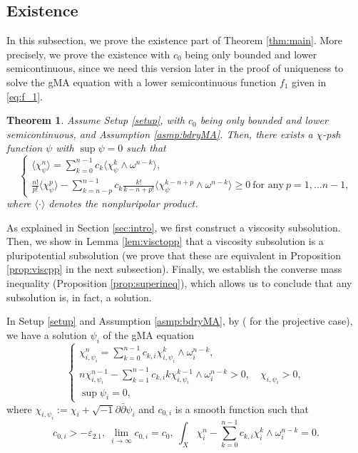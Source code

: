 \documentclass{amsart}
\numberwithin{equation}{section}
\theoremstyle{plain}
\newtheorem{thm}[equation]{Theorem}
\theoremstyle{definition}
\theoremstyle{remark}
\newcommand{\delb}{\sqrt{-1}\partial\bar{\partial}}
\begin{document}
\subsection{Existence}\label{sec:existence}
In this subsection, we prove the existence part of Theorem \ref{thm:main}. More precisely, we prove the existence with $c_0$ being only bounded and lower semicontinuous, since we need this version later in the proof of uniqueness to solve the gMA equation with a lower semicontinuous function $f_1$ given in \eqref{eq:f_1}.

\begin{thm}\label{thm:existence}
    Assume Setup \ref{setup}, with $c_0$ being only bounded and lower semicontinuous, and Assumption \ref{asmp:bdryMA}.
    Then, there exists a $\chi$-psh function $\psi$ with $\sup \psi=0$ such that
    \begin{equation}\label{eq:lscgMA}
    \begin{cases}
        \langle\chi_\psi^n\rangle=\sum_{k=0}^{n-1}c_k\langle\chi_\psi^k\wedge\omega^{n-k}\rangle,
        \\
        \frac{n!}{p!}\langle\chi_\psi^p\rangle-\sum_{k=n-p}^{n-1}c_k\frac{k!}{k-n+p!}\langle\chi_\psi^{k-n+p}\wedge\omega^{n-k}\rangle\ge0 \ \text{for any} \ p=1,\dots n-1, 
    \end{cases}
    \end{equation}
    where $\langle\cdot\rangle$ denotes the nonpluripolar product.
\end{thm}

As explained in Section \ref{sec:intro}, we first construct a viscosity subsolution. 
Then, we show in Lemma \ref{lem:visctopp} that a viscosity subsolution is a pluripotential subsolution (we prove that these are equivalent in Proposition \ref{prop:viscpp} in the next subsection). Finally, we establish the converse mass inequality (Proposition \ref{prop:superineq}), which allows us to conclude that any subsolution is, in fact, a solution.

In Setup \ref{setup} and Assumption \ref{asmp:bdryMA}, by \cite{FM} (\cite{Datar-Pingali} for the projective case), 
we have a solution $\psi_i$ of the gMA equation
\begin{equation}\label{eq:appgMA}
    \begin{cases}
        \chi^n_{i,\psi_i}=\sum_{k=0}^{n-1}c_{k,i}\chi_{i,\psi_i}^k \wedge\omega_i^{n-k},\\
        n\chi_{i,\psi_i}^{n-1}-\sum_{k=1}^{n-1}c_{k,i} k\chi^{k-1}_{i,\psi_i}\wedge\omega_i^{n-k}>0 ,\quad \chi_{i,\psi_i}>0,\\
        \sup \psi_i=0,
    \end{cases}
    \end{equation}
    where $\chi_{i,\psi_i}:=\chi_i+\delb\psi_i$ and $c_{0,i}$ is a smooth function such that 
    \begin{equation}\label{eq:topnum}
        c_{0,i}>-\varepsilon_{2.1},\ \lim_{i\to\infty} c_{0,i}=c_0,\ \int_X\chi^n_i-\sum_{k=0}^{n-1}c_{k,i}\chi_i^k \wedge\omega_i^{n-k}=0.
    \end{equation}
\end{document}
